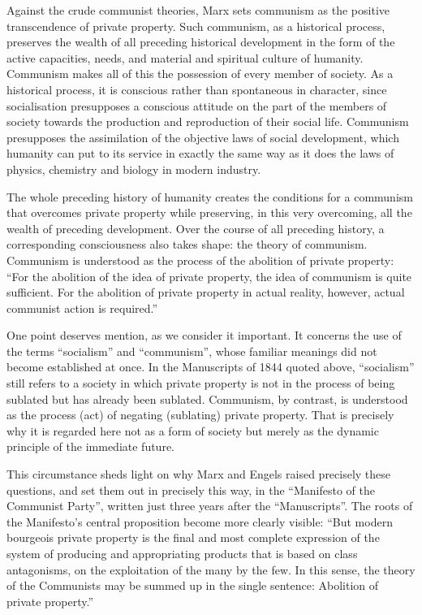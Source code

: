 \documentclass[12pt,a4paper,openany]{book}
\begin{document}
Against the crude communist theories, Marx sets communism as the positive transcendence of private property. Such communism, as a historical process, preserves the wealth of all preceding historical development in the form of the active capacities, needs, and material and spiritual culture of humanity. Communism makes all of this the possession of every member of society. As a historical process, it is conscious rather than spontaneous in character, since socialisation presupposes a conscious attitude on the part of the members of society towards the production and reproduction of their social life. Communism presupposes the assimilation of the objective laws of social development, which humanity can put to its service in exactly the same way as it does the laws of physics, chemistry and biology in modern industry.

The whole preceding history of humanity creates the conditions for a communism that overcomes private property while preserving, in this very overcoming, all the wealth of preceding development. Over the course of all preceding history, a corresponding consciousness also takes shape: the theory of communism. Communism is understood as the process of the abolition of private property: “For the abolition of the idea of private property, the idea of communism is quite sufficient. For the abolition of private property in actual reality, however, actual communist action is required.”

One point deserves mention, as we consider it important. It concerns the use of the terms “socialism” and “communism”, whose familiar meanings did not become established at once. In the Manuscripts of 1844 quoted above, “socialism” still refers to a society in which private property is not in the process of being sublated but has already been sublated. Communism, by contrast, is understood as the process (act) of negating (sublating) private property. That is precisely why it is regarded here not as a form of society but merely as the dynamic principle of the immediate future.

This circumstance sheds light on why Marx and Engels raised precisely these questions, and set them out in precisely this way, in the “Manifesto of the Communist Party”, written just three years after the “Manuscripts”. The roots of the Manifesto’s central proposition become more clearly visible: “But modern bourgeois private property is the final and most complete expression of the system of producing and appropriating products that is based on class antagonisms, on the exploitation of the many by the few. In this sense, the theory of the Communists may be summed up in the single sentence: Abolition of private property.”
\end{document}
